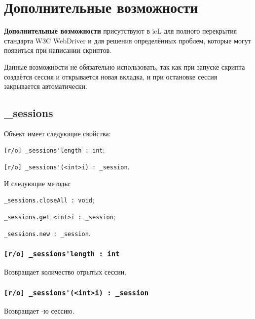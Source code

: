\section{Дополнительные возможности}

{\bf Дополнительные возможности} присутствуют в icL для полного перекрытия стандарта W3C WebDriver и для решения определённых проблем, которые могут появиться при написании скриптов.

Данные возможности не обязательно использовать, так как при запуске скрипта создаётся сессия и открывается новая вкладка, и при остановке сессия закрывается автоматически.


\subsection{{\color{orange} \_sessions}}

Объект \sessions{} имеет следующие свойства:
\begin{icItems}
	\item \lstinline|[r/o] _sessions'length : int|;
	\item \lstinline|[r/o] _sessions'(<int>i) : _session|.
\end{icItems}

И следующие методы:
\begin{icItems}
	\item \lstinline|_sessions.closeAll : void|;
	\item \lstinline|_sessions.get <int>i : _session|;
	\item \lstinline|_sessions.new : _session|.
\end{icItems}

\subsubsection{\lstinline|[r/o] _sessions'length : int|}

Возвращает количество отрытых сессии.

\subsubsection{\lstinline|[r/o] _sessions'(<int>i) : _session|}

Возвращает -ю сессию.

